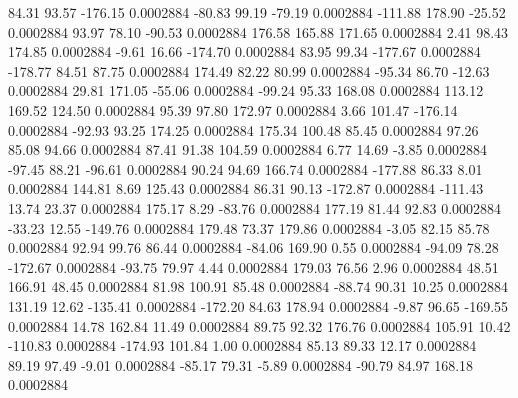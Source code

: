        84.31       93.57     -176.15     0.0002884
      -80.83       99.19      -79.19     0.0002884
     -111.88      178.90      -25.52     0.0002884
       93.97       78.10      -90.53     0.0002884
      176.58      165.88      171.65     0.0002884
        2.41       98.43      174.85     0.0002884
       -9.61       16.66     -174.70     0.0002884
       83.95       99.34     -177.67     0.0002884
     -178.77       84.51       87.75     0.0002884
      174.49       82.22       80.99     0.0002884
      -95.34       86.70      -12.63     0.0002884
       29.81      171.05      -55.06     0.0002884
      -99.24       95.33      168.08     0.0002884
      113.12      169.52      124.50     0.0002884
       95.39       97.80      172.97     0.0002884
        3.66      101.47     -176.14     0.0002884
      -92.93       93.25      174.25     0.0002884
      175.34      100.48       85.45     0.0002884
       97.26       85.08       94.66     0.0002884
       87.41       91.38      104.59     0.0002884
        6.77       14.69       -3.85     0.0002884
      -97.45       88.21      -96.61     0.0002884
       90.24       94.69      166.74     0.0002884
     -177.88       86.33        8.01     0.0002884
      144.81        8.69      125.43     0.0002884
       86.31       90.13     -172.87     0.0002884
     -111.43       13.74       23.37     0.0002884
      175.17        8.29      -83.76     0.0002884
      177.19       81.44       92.83     0.0002884
      -33.23       12.55     -149.76     0.0002884
      179.48       73.37      179.86     0.0002884
       -3.05       82.15       85.78     0.0002884
       92.94       99.76       86.44     0.0002884
      -84.06      169.90        0.55     0.0002884
      -94.09       78.28     -172.67     0.0002884
      -93.75       79.97        4.44     0.0002884
      179.03       76.56        2.96     0.0002884
       48.51      166.91       48.45     0.0002884
       81.98      100.91       85.48     0.0002884
      -88.74       90.31       10.25     0.0002884
      131.19       12.62     -135.41     0.0002884
     -172.20       84.63      178.94     0.0002884
       -9.87       96.65     -169.55     0.0002884
       14.78      162.84       11.49     0.0002884
       89.75       92.32      176.76     0.0002884
      105.91       10.42     -110.83     0.0002884
     -174.93      101.84        1.00     0.0002884
       85.13       89.33       12.17     0.0002884
       89.19       97.49       -9.01     0.0002884
      -85.17       79.31       -5.89     0.0002884
      -90.79       84.97      168.18     0.0002884
